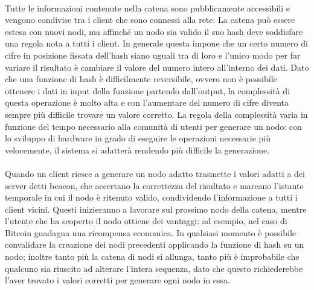 	\paragraph*{} Tutte le informazioni contenute nella catena sono pubblicamente accessibili e vengono condivise tra i client che sono connessi alla rete. La catena può essere estesa con nuovi nodi, ma affinché un nodo sia valido il suo hash deve soddisfare una regola nota a tutti i client. In generale questa impone che un certo numero di cifre in posizione fissata dell'hash siano uguali tra di loro e l'unico modo per far variare il risultato è cambiare il valore del numero intero all'interno dei dati. Dato che una funzione di hash è difficilmente reversibile, ovvero non è possibile ottenere i dati in input della funzione partendo dall'output, la complessità di questa operazione è molto alta e con l'aumentare del numero di cifre diventa sempre più difficile trovare un valore corretto. La regola della complessità varia in funzione del tempo necessario alla comunità di utenti per generare un nodo: con lo sviluppo di hardware in grado di eseguire le operazioni necessarie più velocemente, il sistema si adatterà rendendo più difficile la generazione.
	\paragraph*{} Quando un client riesce a generare un nodo adatto trasmette i valori adatti a dei server detti beacon, che accertano la correttezza del risultato e marcano l'istante temporale in cui il nodo è ritenuto valido, condividendo l'informazione a tutti i client vicini. Questi inizieranno a lavorare sul prossimo nodo della catena, mentre l'utente che ha scoperto il nodo ottiene dei vantaggi: ad esempio, nel caso di Bitcoin guadagna una ricompensa economica. In qualsiasi momento è possibile convalidare la creazione dei nodi precedenti applicando la funzione di hash su un nodo; inoltre tanto più la catena di nodi si allunga, tanto più è improbabile che qualcuno sia riuscito ad alterare l'intera sequenza, dato che questo richiederebbe l'aver trovato i valori corretti per generare ogni nodo in essa.
